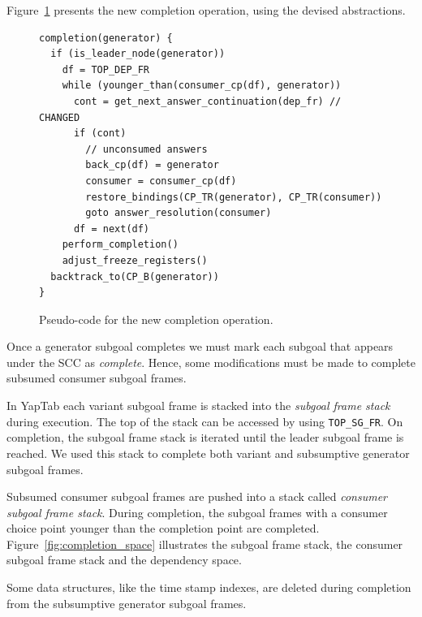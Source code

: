 Figure~\ref{fig:completion_operation} presents the new completion operation,
using the devised abstractions.

\begin{figure}[ht]
\begin{Verbatim}
completion(generator) {
  if (is_leader_node(generator))
    df = TOP_DEP_FR
    while (younger_than(consumer_cp(df), generator))
      cont = get_next_answer_continuation(dep_fr) // CHANGED
      if (cont)
        // unconsumed answers
        back_cp(df) = generator
        consumer = consumer_cp(df)
        restore_bindings(CP_TR(generator), CP_TR(consumer))
        goto answer_resolution(consumer)
      df = next(df)
    perform_completion()
    adjust_freeze_registers()
  backtrack_to(CP_B(generator))
}
\end{Verbatim}
\caption{Pseudo-code for the new completion operation.}
\label{fig:completion_operation}
\end{figure}

Once a generator subgoal completes we must mark each subgoal that appears under the SCC as \textit{complete}.
Hence, some modifications must be made to complete subsumed consumer subgoal frames.

In YapTab each variant subgoal frame is stacked into the \textit{subgoal frame stack} during execution.
The top of the stack can be accessed by using \texttt{TOP\_SG\_FR}.  On completion, the subgoal frame
stack is iterated until the leader subgoal frame is reached. We used this stack to complete both
variant and subsumptive generator subgoal frames.

Subsumed consumer subgoal frames are pushed into a stack called \textit{consumer subgoal frame stack}.
During completion, the subgoal frames with a consumer choice point
younger than the completion point are completed. Figure~\ref{fig:completion_space} illustrates the
subgoal frame stack, the consumer subgoal frame stack and the dependency space.

Some data structures, like the time stamp indexes, are deleted during completion from the
subsumptive generator subgoal frames.

